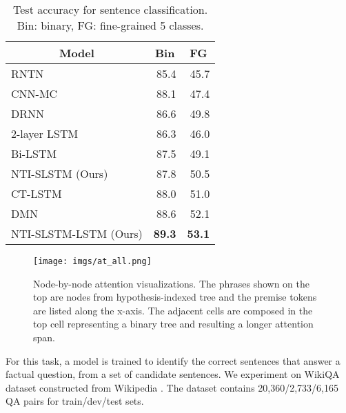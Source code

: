 \documentclass[11pt]{article}
\begin{document}
\begin{table}[t]
\begin{center}
\small
\begin{tabular}{c|c|c}
\hline 
Model & Bin & FG \\
\hline
\multicolumn{1}{l|}{RNTN \cite{socher2013recursive}} & \multicolumn{1}{|r|}{85.4} & \multicolumn{1}{|r}{45.7} \\
\multicolumn{1}{l|}{CNN-MC \cite{kim:13}} & \multicolumn{1}{|r|}{88.1} & \multicolumn{1}{|r}{47.4} \\
\multicolumn{1}{l|}{DRNN \cite{irsoy15}} & \multicolumn{1}{|r|}{86.6} & \multicolumn{1}{|r}{49.8} \\
\multicolumn{1}{l|}{2-layer LSTM \cite{tai2015improved}} & \multicolumn{1}{|r|}{86.3} & \multicolumn{1}{|r}{46.0} \\
\multicolumn{1}{l|}{Bi-LSTM \cite{tai2015improved}} & \multicolumn{1}{|r|}{87.5} & \multicolumn{1}{|r}{49.1} \\
\multicolumn{1}{l|}{NTI-SLSTM (Ours)} & \multicolumn{1}{|r|}{87.8} & \multicolumn{1}{|r}{50.5} \\
\multicolumn{1}{l|}{CT-LSTM \cite{tai2015improved}} & \multicolumn{1}{|r|}{88.0} & \multicolumn{1}{|r}{51.0} \\
\multicolumn{1}{l|}{DMN \cite{ankit16}} & \multicolumn{1}{|r|}{88.6} & \multicolumn{1}{|r}{52.1} \\
\multicolumn{1}{l|}{NTI-SLSTM-LSTM (Ours)} & \multicolumn{1}{|r|}{\bf  89.3} & \multicolumn{1}{|r}{\bf 53.1} \\
\hline
\end{tabular}
\end{center}
\caption{\label{table:sent}Test accuracy for sentence classification. Bin: binary, FG: fine-grained 5 classes.}
\end{table}

\begin{figure*}[t]
\hspace*{-0.8cm}
    \centering
        \texttt{[image: imgs/at\_all.png]}
\caption{Node-by-node attention visualizations. The phrases shown on the top are nodes from hypothesis-indexed tree and the premise tokens are listed along the x-axis. The adjacent cells are composed in the top cell representing a binary tree and resulting a longer attention span.}
        \label{figure:at}
\end{figure*}

For this task, a model is trained to identify the correct sentences that answer a factual question, from a set of candidate sentences. We experiment on WikiQA dataset constructed from Wikipedia \cite{yang2015wikiqa}. The dataset contains 20,360/2,733/6,165 QA pairs for train/dev/test sets.
\end{document}
